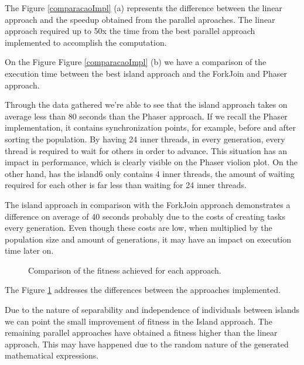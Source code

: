 \documentclass[runningheads]{llncs}
\begin{document}
The Figure \ref{comparacaoImpl} (a) represents the difference between the linear approach and the speedup obtained from the parallel aproaches. The linear approach required up to 50x the time from the best parallel approach implemented to accomplish the computation.

On the Figure Figure \ref{comparacaoImpl} (b) we have a comparison of the execution time between the best island approach and the ForkJoin and Phaser approach.

Through the data gathered we're able to see that the island approach takes on average less than 80 seconds than the Phaser approach. If we recall the Phaser implementation, it contains synchronization points, for example, before and after sorting the population. By having 24 inner threads, in every generation, every thread is required to wait for others in order to advance. This situation has an impact in performance, which is clearly visible on the Phaser violion plot. On the other hand, has the island6 only contains 4 inner threads, the amount of waiting required for each other is far less than waiting for 24 inner threads.

The island approach in comparison with the ForkJoin approach demonstrates a difference on average of 40 seconds probably due to the costs of creating tasks every generation. Even though these costs are low, when multiplied by the population size and amount of generations, it may have an impact on execution time later on.



\begin{figure}[H]
\centering
{}
\caption{Comparison of the fitness achieved for each approach.} \label{comparacaofitness}
\end{figure}

The Figure \ref{comparacaofitness} addresses the differences between the approaches implemented.

Due to the nature of separability and independence of individuals between islands \cite{islandModelGA} we can point the small improvement of fitness in the Island approach.
The remaining parallel approaches have obtained a fitness higher than the linear approach. This may have happened due to the random nature of the generated mathematical expressions.
\end{document}
